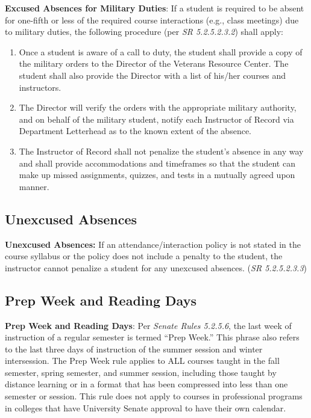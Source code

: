 \documentclass[
  letterpaper,
  DIV=11,
  numbers=noendperiod]{scrartcl}
\begin{document}
\textbf{Excused Absences for Military Duties}: If a student is required
to be absent for one-fifth or less of the required course interactions
(e.g., class meetings) due to military duties, the following procedure
(per \emph{SR 5.2.5.2.3.2}) shall apply:

\begin{enumerate}
\def\labelenumi{\arabic{enumi}.}
\item
  Once a student is aware of a call to duty, the student shall provide a
  copy of the military orders to the Director of the Veterans Resource
  Center. The student shall also provide the Director with a list of
  his/her courses and instructors.
\item
  The Director will verify the orders with the appropriate military
  authority, and on behalf of the military student, notify each
  Instructor of Record via Department Letterhead as to the known extent
  of the absence.
\item
  The Instructor of Record shall not penalize the student's absence in
  any way and shall provide accommodations and timeframes so that the
  student can make up missed assignments, quizzes, and tests in a
  mutually agreed upon manner.
\end{enumerate}

\hypertarget{unexcused-absences}{%
\subsection{Unexcused Absences}\label{unexcused-absences}}

\textbf{Unexcused Absences:} If an attendance/interaction policy is not
stated in the course syllabus or the policy does not include a penalty
to the student, the instructor cannot penalize a student for any
unexcused absences. (\emph{SR 5.2.5.2.3.3})

\hypertarget{prep-week-and-reading-days}{%
\subsection{Prep Week and Reading
Days}\label{prep-week-and-reading-days}}

\textbf{Prep Week and Reading Days}: Per \emph{Senate Rules 5.2.5.6},
the last week of instruction of a regular semester is termed ``Prep
Week.'' This phrase also refers to the last three days of instruction of
the summer session and winter intersession. The Prep Week rule applies
to ALL courses taught in the fall semester, spring semester, and summer
session, including those taught by distance learning or in a format that
has been compressed into less than one semester or session. This rule
does not apply to courses in professional programs in colleges that have
University Senate approval to have their own calendar.
\end{document}
